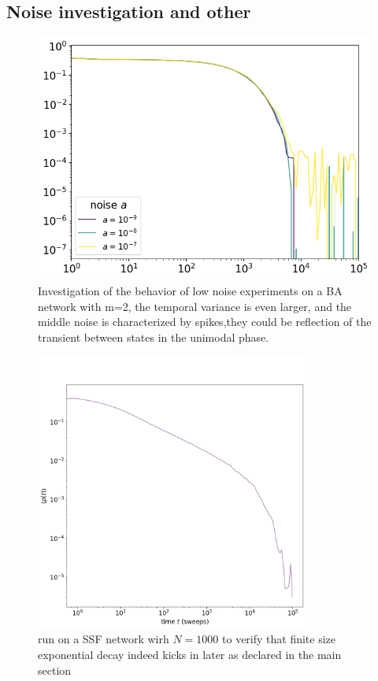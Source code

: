 \begin{appendices}
\section{Noise investigation and other}

\begin{figure}[htbp]
  \centering
  \includegraphics[width=14cm,keepaspectratio]{images/BA_low_noise.png}
  \caption{Investigation of the behavior of low noise experiments on a BA network with m=2, the temporal variance is even larger, and the middle noise is characterized by spikes,they could be reflection of the transient between states in the unimodal phase.}
  
\end{figure}


\begin{figure}[htbp]
  \centering
  \includegraphics[width=9cm,keepaspectratio]{images/quick_check.png}
  \caption{run on a SSF network wirh $N=1000$ to verify that finite size exponential decay indeed kicks in later as declared in the main section}
  

\end{figure}
\end{appendices}
